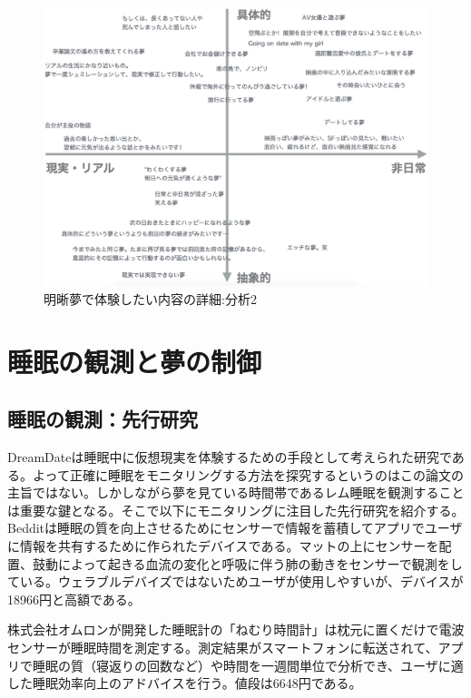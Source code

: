 \begin{figure}[htbp]
\begin{center}
\includegraphics[width=13cm]{eps/whatYouWantToDream.eps}
\caption{明晰夢で体験したい内容の詳細:分析2}
\label{desiredDreamTpye2}
\end{center}
\end{figure}

\section{睡眠の観測と夢の制御}
\subsection{睡眠の観測：先行研究}
DreamDateは睡眠中に仮想現実を体験するための手段として考えられた研究である。よって正確に睡眠をモニタリングする方法を探究するというのはこの論文の主旨ではない。しかしながら夢を見ている時間帯であるレム睡眠を観測することは重要な鍵となる。そこで以下にモニタリングに注目した先行研究を紹介する。\\
Bedditは睡眠の質を向上させるためにセンサーで情報を蓄積してアプリでユーザに情報を共有するために作られたデバイスである\cite{beddit}。マットの上にセンサーを配置、鼓動によって起きる血流の変化と呼吸に伴う肺の動きをセンサーで観測をしている。ウェラブルデバイズではないためユーザが使用しやすいが、デバイスが18966円と高額である。

株式会社オムロンが開発した睡眠計の「ねむり時間計」は枕元に置くだけで電波センサーが睡眠時間を測定する\cite{omron}。測定結果がスマートフォンに転送されて、アプリで睡眠の質（寝返りの回数など）や時間を一週間単位で分析でき、ユーザに適した睡眠効率向上のアドバイスを行う。値段は6648円である。

